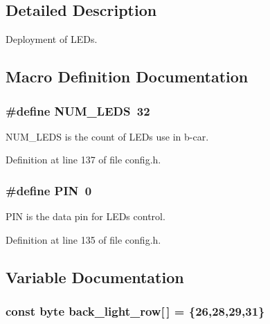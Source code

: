 \subsection{Detailed Description}
Deployment of L\+E\+Ds. 



\subsection{Macro Definition Documentation}
\subsubsection[{\texorpdfstring{N\+U\+M\+\_\+\+L\+E\+DS}{NUM_LEDS}}]{\setlength{\rightskip}{0pt plus 5cm}\#define N\+U\+M\+\_\+\+L\+E\+DS~32}\hypertarget{group__deployment_ga4c4ae9a4146ce8d6a5debc90300d9abd}{}\label{group__deployment_ga4c4ae9a4146ce8d6a5debc90300d9abd}
N\+U\+M\+\_\+\+L\+E\+DS is the count of L\+E\+Ds use in b-\/car. 

Definition at line 137 of file config.\+h.

\subsubsection[{\texorpdfstring{P\+IN}{PIN}}]{\setlength{\rightskip}{0pt plus 5cm}\#define P\+IN~0}\hypertarget{group__deployment_gae1a27401b7fb01ccb9a82dbddbb54eea}{}\label{group__deployment_gae1a27401b7fb01ccb9a82dbddbb54eea}
P\+IN is the data pin for L\+E\+Ds control. 

Definition at line 135 of file config.\+h.



\subsection{Variable Documentation}
\subsubsection[{\texorpdfstring{back\+\_\+light\+\_\+row}{back_light_row}}]{\setlength{\rightskip}{0pt plus 5cm}const byte back\+\_\+light\+\_\+row\mbox{[}$\,$\mbox{]} = \{26,28,29,31\}}\hypertarget{group__deployment_ga516415cfaebc59b71f822fb4cf86b22c}{}\label{group__deployment_ga516415cfaebc59b71f822fb4cf86b22c}


